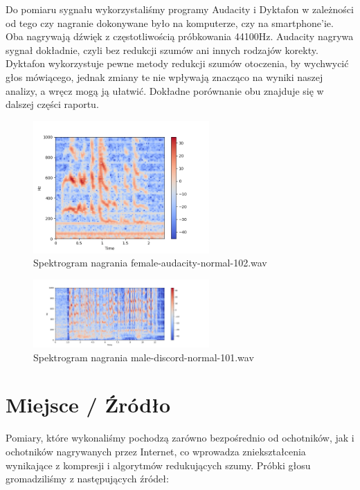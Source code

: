 \documentclass[a4paper,12pt]{extarticle}
\begin{document}
Do pomiaru sygnału wykorzystaliśmy programy Audacity i Dyktafon w zależności od tego czy nagranie dokonywane było na komputerze, czy na smartphone’ie. Oba nagrywają dźwięk z częstotliwością próbkowania 44100Hz. Audacity nagrywa sygnał dokładnie, czyli bez redukcji szumów ani innych rodzajów korekty. Dyktafon wykorzystuje pewne metody redukcji szumów otoczenia, by wychwycić głos mówiącego, jednak zmiany te nie wpływają znacząco na wyniki naszej analizy, a wręcz mogą ją ułatwić. Dokładne porównanie obu znajduje się w dalszej części raportu.

\begin{figure}[ht]
\centering
\includegraphics[width=0.6\textwidth]{1_female-audacity-normal-102.png}
\caption{ Spektrogram nagrania female-audacity-normal-102.wav}
\end{figure}

\begin{figure}[ht]
\centering
\includegraphics[width=0.6\textwidth]{1_male-discord-normal-101.png}
\caption{ Spektrogram nagrania male-discord-normal-101.wav}
\end{figure}

\newpage
       
\section*{Miejsce / Źródło}

Pomiary, które wykonaliśmy pochodzą zarówno bezpośrednio od ochotników, jak i ochotników nagrywanych przez Internet, co wprowadza zniekształcenia wynikające z kompresji i algorytmów redukujących szumy. Próbki głosu gromadziliśmy z następujących źródeł:
\end{document}

